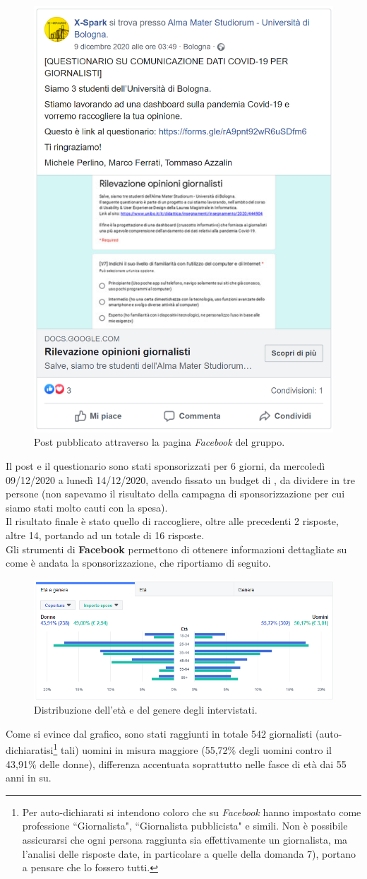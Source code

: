 \begin{figure}[!h] 
    \centering 
    \includegraphics[width=0.4\columnwidth]{assets/images/ricerca-etnografica/post-facebook} 
    \caption{Post pubblicato attraverso la pagina \textit{Facebook} del gruppo.}
\end{figure}

Il post e il questionario sono stati sponsorizzati per 6 giorni, da mercoledì 09/12/2020 a lunedì 14/12/2020, avendo fissato un budget di , da dividere in tre persone (non sapevamo il risultato della campagna di sponsorizzazione per cui siamo stati molto cauti con la spesa).\\
Il risultato finale è stato quello di raccogliere, oltre alle precedenti 2 risposte, altre 14, portando ad un totale di 16 risposte.\\
Gli strumenti di \textbf{Facebook} permettono di ottenere informazioni dettagliate su come è andata la sponsorizzazione, che riportiamo di seguito.

\begin{figure}[!h] 
    \centering 
    \includegraphics[width=0.9\columnwidth]{assets/images/ricerca-etnografica/post-facebook-statistiche-eta-genere} 
    \caption{Distribuzione dell'età e del genere degli intervistati.}
\end{figure}
Come si evince dal grafico, sono stati raggiunti in totale 542 giornalisti (auto-dichiaratisi\footnote{Per auto-dichiarati si intendono coloro che su \textit{Facebook} hanno impostato come professione ``Giornalista", ``Giornalista pubblicista" e simili. Non è possibile assicurarsi che ogni persona raggiunta sia effettivamente un giornalista, ma l'analisi delle risposte date, in particolare a quelle della domanda 7), portano a pensare che lo fossero tutti.} tali) uomini in misura maggiore (55,72\% degli uomini contro il 43,91\% delle donne), differenza accentuata soprattutto nelle fasce di età dai 55 anni in su.


